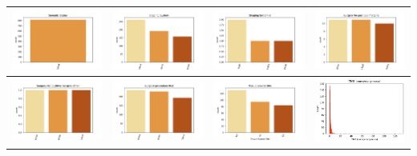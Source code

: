 \begin{center}
\begin{tabular}{ |c|c|c|c| }
		\\  \hline 
		\includegraphics[width=.25\textwidth]{NOTEBOOK/IMAGENES_CRUDAS/101} 
		& \includegraphics[width=.25\textwidth]{NOTEBOOK/IMAGENES_CRUDAS/102} 
		& \includegraphics[width=.25\textwidth]{NOTEBOOK/IMAGENES_CRUDAS/103} 
		& \includegraphics[width=.25\textwidth]{NOTEBOOK/IMAGENES_CRUDAS/104} 
		\\  \hline 
		\includegraphics[width=.25\textwidth]{NOTEBOOK/IMAGENES_CRUDAS/105} 
		& \includegraphics[width=.25\textwidth]{NOTEBOOK/IMAGENES_CRUDAS/106} 
		& \includegraphics[width=.25\textwidth]{NOTEBOOK/IMAGENES_CRUDAS/107} 
		& \includegraphics[width=.25\textwidth]{NOTEBOOK/IMAGENES_CRUDAS/108} 

\end{tabular}
\end{center}
